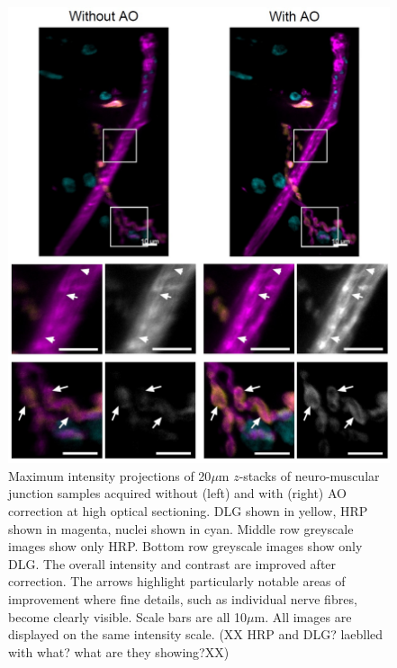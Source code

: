 \begin{figure}[h]
	\centering
	\includegraphics[width=\textwidth]{images/Aurox_NMJ_composite_grey_and_color.jpg}
	\caption[\textit{Drosophila} neuro-muscular junction data acquired on the Aurox imaging 
	system]{Maximum intensity projections of 20$\mu$m $z$-stacks of 
		neuro-muscular junction samples acquired without (left) and with 
		(right) AO correction at high optical sectioning. 
		DLG shown in yellow, HRP shown in magenta, nuclei shown in cyan. 
		Middle row greyscale images show only HRP. Bottom row greyscale 
		images show only DLG. The overall intensity and contrast are 
		improved after correction. The arrows highlight particularly 
		notable areas of improvement where fine details, such as 
		individual nerve fibres, become clearly visible. Scale bars are 
		all 10$\mu$m. All images are displayed on the same intensity 
		scale. (XX HRP and DLG? laeblled with what? what are
                they showing?XX)}
	\label{fig:Aurox_NMJ_composite_grey_and_color}
\end{figure}
